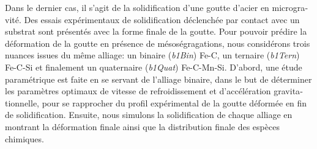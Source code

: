 \begin{otherlanguage}{french}
{Dans le dernier cas, il s'agit de la solidification d'une goutte d'acier en microgravité. 
Des essais expérimentaux de solidification déclenchée par contact avec un substrat sont présentés avec la forme finale de la goutte.
Pour pouvoir prédire la déformation de la goutte en présence de mésoségragations, nous considérons trois nuances issues du même alliage:
un binaire (\emph{b1Bin}) Fe-C, un ternaire (\emph{b1Tern}) Fe-C-Si et finalement un quaternaire (\emph{b1Quat}) Fe-C-Mn-Si.
D'abord, une étude paramétrique est faite en se servant de l'alliage binaire, dans le but de déterminer les paramètres optimaux de vitesse
de refroidissement et d'accélération gravitationnelle, pour se rapprocher du profil expérimental de la goutte déformée en fin de solidification.
Ensuite, nous simulons la solidification de chaque alliage en montrant la déformation finale ainsi que la distribution finale
des espèces chimiques.  

}
\end{otherlanguage}
